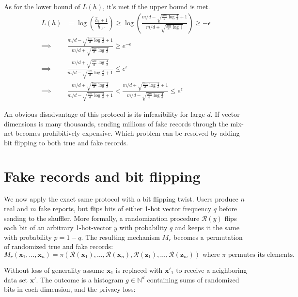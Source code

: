 \documentclass[11pt]{article}
\newcommand{\bbx}{\pmb{x}}
\newcommand{\bbz}{\pmb{z}}
\newcommand{\cR}{\mathcal{R}}
\newcommand{\N}{\mathbb{N}}
\begin{document}
As for the lower bound of $L(h)$, it's met if the upper bound is met.
 \begin{align*}
 L(h) & =  \log  \left ( \frac{\hat{h}_\ell + 1}{\hat{h}_{\ell'}} \right ) \ge \log  \left ( \frac{ m/d - \sqrt{  \frac{3m}{d} \log{\frac{4}{\delta}}} + 1}{  m/d + \sqrt{  \frac{3m}{d} \log{\frac{4}{\delta}}} } \right ) \ge - \epsilon  \\
\implies &  \frac{ m/d - \sqrt{  \frac{3m}{d} \log{\frac{4}{\delta}}} + 1}{  m/d + \sqrt{  \frac{3m}{d} \log{\frac{4}{\delta}}}} \ge e^{-\epsilon} \\
 \implies &  \frac{  m/d + \sqrt{  \frac{3m}{d} \log{\frac{4}{\delta}}}}  { m/d - \sqrt{  \frac{3m}{d} \log{\frac{4}{\delta}}} + 1} \le e^{\epsilon}  \\
\implies &   \frac{  m/d + \sqrt{  \frac{3m}{d} \log{\frac{4}{\delta}}}}  { m/d - \sqrt{  \frac{3m}{d} \log{\frac{4}{\delta}}} + 1} < \frac{ m/d + \sqrt{  \frac{3m}{d} \log{\frac{4}{\delta}}} + 1}{  m/d - \sqrt{  \frac{3m}{d} \log{\frac{4}{\delta}}}} \le e^{\epsilon} 
\end{align*}

An obvious disadvantage of this protocol is its infeasibility for large $d$. If vector dimensions is many thousands, sending millions of fake records through the mix-net becomes prohibitively expensive.  Which problem can be resolved by adding bit flipping to both true and fake records.


\section{Fake records and bit flipping}

We now apply the exact same protocol with a bit flipping twist. Users produce $n$ real and $m$ fake reports, but flips bits of either 1-hot vector frequency $q$ before sending to the shuffler.  More formally, a randomization procedure $\cR(y)$ flips each bit of an arbitrary 1-hot-vector $y$ with probability $q$ and keeps it the same with probability $p=1-q$.  The resulting mechanism $M_r$ becomes a permutation of randomized true and fake records:
\[
M_r(\bbx_1,  \dots , \bbx_n) = \pi (\cR(\bbx_1), \dots , \cR(\bbx_n), \cR(\bbz_1), \dots , \cR(\bbz_m)) \text{ where } \pi \text{ permutes its elements}. 
\]

Without loss of generality assume $\bbx_1$ is replaced with $\bbx'_1$ to receive a neighboring data set $\bbx'$.  The outcome is a histogram $g \in \N^d$ containing sums of randomized bits in each dimension, and the privacy loss:
\end{document}
